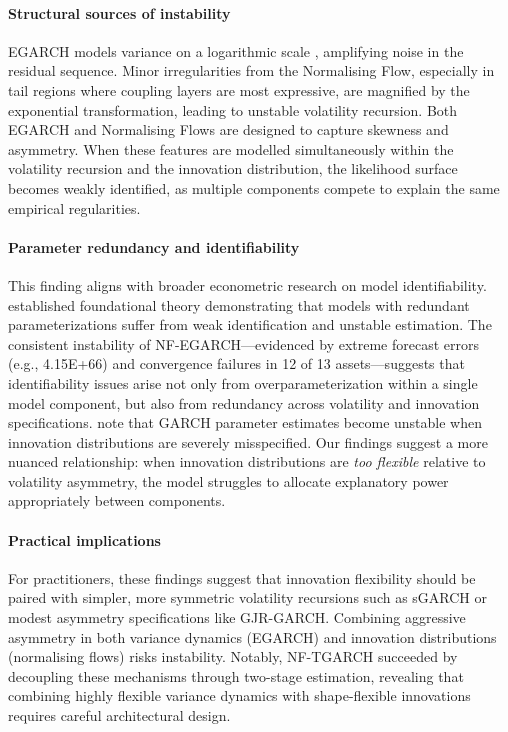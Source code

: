 \documentclass[risks,article,submit,pdftex,moreauthors]{Definitions/mdpi}
\begin{document}
\paragraph{\textbf{Structural sources of instability}}
EGARCH models variance on a logarithmic scale \citep{nelson1991conditional}, amplifying noise in the residual sequence. Minor irregularities from the Normalising Flow, especially in tail regions where coupling layers are most expressive, are magnified by the exponential transformation, leading to unstable volatility recursion. Both EGARCH and Normalising Flows are designed to capture skewness and asymmetry. When these features are modelled simultaneously within the volatility recursion and the innovation distribution, the likelihood surface becomes weakly identified, as multiple components compete to explain the same empirical regularities.

\paragraph{\textbf{Parameter redundancy and identifiability}}
This finding aligns with broader econometric research on model identifiability. \cite{rothenberg1971identification} established foundational theory demonstrating that models with redundant parameterizations suffer from weak identification and unstable estimation. The consistent instability of NF-EGARCH—evidenced by extreme forecast errors (e.g., 4.15E+66) and convergence failures in 12 of 13 assets—suggests that identifiability issues arise not only from overparameterization within a single model component, but also from redundancy across volatility and innovation specifications. \cite{francq2010garch} note that GARCH parameter estimates become unstable when innovation distributions are severely misspecified. Our findings suggest a more nuanced relationship: when innovation distributions are \emph{too flexible} relative to volatility asymmetry, the model struggles to allocate explanatory power appropriately between components.

\paragraph{\textbf{Practical implications}}
For practitioners, these findings suggest that innovation flexibility should be paired with simpler, more symmetric volatility recursions such as sGARCH or modest asymmetry specifications like GJR-GARCH. Combining aggressive asymmetry in both variance dynamics (EGARCH) and innovation distributions (normalising flows) risks instability. Notably, NF-TGARCH succeeded by decoupling these mechanisms through two-stage estimation, revealing that combining highly flexible variance dynamics with shape-flexible innovations requires careful architectural design.
\end{document}
